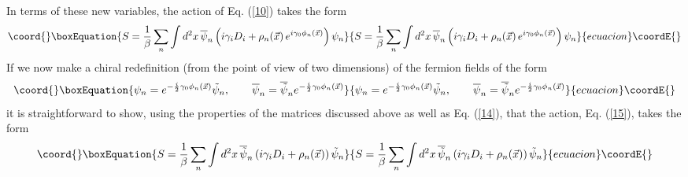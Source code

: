 \documentclass[a4paper,12pt]{article}
\begin{document}
In terms of these new variables, the action of
Eq. (\ref{10}) takes the form
\begin{equation}\coord{}\boxEquation{
 S = {1\over \beta} \sum_{n} \int d^{2}x\, \overline{\psi}_{n}
\left(i\gamma_{i}D_{i} +
  \rho_{n}(\vec{x})\,e^{i\gamma_{0}\phi_{n}(\vec{x})}\right)\psi_{n}\label{15}
}{
 S = {1\over \beta} \sum_{n} \int d^{2}x\, \overline{\psi}_{n}
\left(i\gamma_{i}D_{i} +
  \rho_{n}(\vec{x})\,e^{i\gamma_{0}\phi_{n}(\vec{x})}\right)\psi_{n}}{ecuacion}\coordE{}\end{equation}
If we now make a chiral redefinition (from the point of view of two dimensions)
 of the fermion fields of the form
\begin{equation}\coord{}\boxEquation{
\psi_{n} = e^{-{i\over 2}\gamma_{0}\phi_{n}(\vec{x})}
\tilde{\psi}_{n},\qquad \overline{\psi}_{n} =
\overline{\tilde{\psi}}_{n} e^{-{i\over
    2}\gamma_{0}\phi_{n}(\vec{x})}\label{16}
}{
\psi_{n} = e^{-{i\over 2}\gamma_{0}\phi_{n}(\vec{x})}
\tilde{\psi}_{n},\qquad \overline{\psi}_{n} =
\overline{\tilde{\psi}}_{n} e^{-{i\over
    2}\gamma_{0}\phi_{n}(\vec{x})}}{ecuacion}\coordE{}\end{equation}
it is straightforward to show, using the properties of the matrices
\coordHE{} discussed above as well as Eq. (\ref{14}), that
the action, Eq. (\ref{15}), takes the form
\begin{equation}\coord{}\boxEquation{
 S = {1\over \beta} \sum_{n} \int d^{2}x\,
\overline{\tilde{\psi}}_{n}\left(i\gamma_{i}D_{i} +
  \rho_{n}(\vec{x})\right)\tilde{\psi}_{n}\label{17}
}{
 S = {1\over \beta} \sum_{n} \int d^{2}x\,
\overline{\tilde{\psi}}_{n}\left(i\gamma_{i}D_{i} +
  \rho_{n}(\vec{x})\right)\tilde{\psi}_{n}}{ecuacion}\coordE{}\end{equation}
\end{document}
